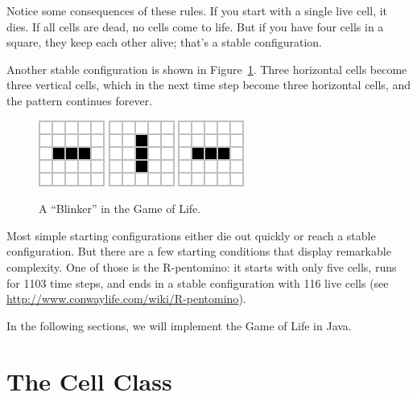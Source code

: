 Notice some consequences of these rules.
If you start with a single live cell, it dies.
If all cells are dead, no cells come to life.
But if you have four cells in a square, they keep each other alive; that's a stable configuration.

Another stable configuration is shown in Figure~\ref{fig:blinker}.
Three horizontal cells become three vertical cells, which in the next time step become three horizontal cells, and the pattern continues forever.

\begin{figure}[!ht]
\begin{center}
\includegraphics{figs/blinker-0.png}
\raisebox{38pt}{~$\longrightarrow$~}
\includegraphics{figs/blinker-1.png}
\raisebox{38pt}{~$\longrightarrow$~}
\includegraphics{figs/blinker-0.png}
\raisebox{38pt}{~$\longrightarrow$~ \ldots}
\caption{A ``Blinker'' in the Game of Life.}
\label{fig:blinker}
\end{center}
\end{figure}

Most simple starting configurations either die out quickly or reach a stable configuration.
But there are a few starting conditions that display remarkable complexity.
One of those is the R-pentomino: it starts with only five cells, runs for 1103 time steps, and ends in a stable configuration with 116 live cells (see
\url{http://www.conwaylife.com/wiki/R-pentomino}).

In the following sections, we will implement the Game of Life in Java.


\section{The Cell Class}

